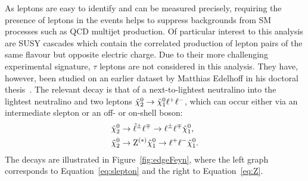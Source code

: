 As leptons are easy to identify and can be measured precisely, requiring the presence of leptons in the events helps to suppress backgrounds from SM processes such as QCD multijet production. Of particular interest to this analysis are SUSY cascades which contain the correlated production of lepton pairs of the same flavour but opposite electric charge. Due to their more challenging experimental signature, $\tau$ leptons are not considered in this analysis. They have, however, been studied on an earlier dataset by Matthias Edelhoff in his doctoral thesis~\cite{Edelhoff:445011}. The relevant decay is that of a next-to-lightest neutralino into the lightest neutralino and two leptons ${\tilde{\chi}^0_2} \rightarrow {\tilde{\chi}^0_1} \ell^+\ell^-$, which can occur either via an intermediate slepton or an off- or on-shell \Z boson:
\begin{align}
{\tilde{\chi}^0_2} &\rightarrow \tilde{\ell}^{\pm}\ell^{\mp} \rightarrow \ell^{\pm}\ell^{\mp}{\tilde{\chi}^0_1},\label{eq:slepton}\\ 
{\tilde{\chi}^0_2} &\rightarrow \mathrm{Z}^{(*)}{\tilde{\chi}^0_1} \rightarrow \ell^+\ell^-{\tilde{\chi}^0_1}.\label{eq:Z}
\end{align}
The decays are illustrated in Figure~\ref{fig:edgeFeyn}, where the left graph corresponds to Equation~\ref{eq:slepton} and the right to Equation~\ref{eq:Z}.
